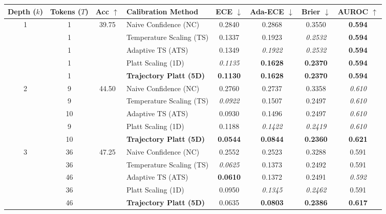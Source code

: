 \begin{table}[t]
\setlength{\tabcolsep}{4pt}
\renewcommand{\arraystretch}{1.05}
\centering
\footnotesize
\begin{tabular}{ccclcccc}
\toprule
\textbf{Depth ($k$)} & \textbf{Tokens ($T$)} & \textbf{Acc} $\uparrow$ & \textbf{Calibration Method} & \textbf{ECE} $\downarrow$ & \textbf{Ada-ECE} $\downarrow$ & \textbf{Brier} $\downarrow$ & \textbf{AUROC} $\uparrow$ \\
\midrule
\multirow{5}{*}{1} & 1 & \multirow{5}{*}{39.75} & Naive Confidence (NC) & 0.2840 & 0.2868 & 0.3550 & \textbf{0.594} \\
 & 1 &  & Temperature Scaling (TS) & 0.1337 & 0.1923 & \textit{0.2532} & \textbf{0.594} \\
 & 1 &  & Adaptive TS (ATS) & 0.1349 & \textit{0.1922} & \textit{0.2532} & \textbf{0.594} \\
 & 1 &  & Platt Scaling (1D) & \textit{0.1135} & \textbf{0.1628} & \textbf{0.2370} & \textbf{0.594} \\
 & 1 &  & \textbf{Trajectory Platt (5D)} & \textbf{0.1130} & \textbf{0.1628} & \textbf{0.2370} & \textbf{0.594} \\
\midrule
\multirow{5}{*}{2} & 9 & \multirow{5}{*}{44.50} & Naive Confidence (NC) & 0.2760 & 0.2737 & 0.3358 & \textit{0.610} \\
 & 9 &  & Temperature Scaling (TS) & \textit{0.0922} & 0.1507 & 0.2497 & \textit{0.610} \\
 & 10 &  & Adaptive TS (ATS) & 0.0930 & 0.1496 & 0.2497 & \textit{0.610} \\
 & 9 &  & Platt Scaling (1D) & 0.1188 & \textit{0.1422} & \textit{0.2419} & \textit{0.610} \\
 & 10 &  & \textbf{Trajectory Platt (5D)} & \textbf{0.0544} & \textbf{0.0844} & \textbf{0.2360} & \textbf{0.621} \\
\midrule
\multirow{5}{*}{3} & 36 & \multirow{5}{*}{47.25} & Naive Confidence (NC) & 0.2552 & 0.2523 & 0.3288 & 0.591 \\
 & 36 &  & Temperature Scaling (TS) & \textit{0.0625} & 0.1373 & 0.2492 & 0.591 \\
 & 46 &  & Adaptive TS (ATS) & \textbf{0.0610} & 0.1372 & 0.2491 & \textit{0.592} \\
 & 36 &  & Platt Scaling (1D) & 0.0950 & \textit{0.1345} & \textit{0.2462} & 0.591 \\
 & 46 &  & \textbf{Trajectory Platt (5D)} & 0.0635 & \textbf{0.0803} & \textbf{0.2386} & \textbf{0.617} \\
\midrule

\end{tabular}
\end{table}
